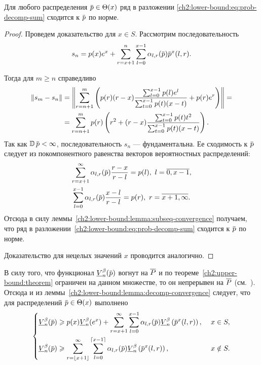 {\begin{lemma}
  \label{ch2:lower-bound:lemma:decomp-convergence}
  Для любого распределения $\pd \in \Theta(x)$ ряд в разложении \eqref{ch2:lower-bound:eq:prob-decomp-sum} сходится к $\pd$ по норме.
\end{lemma}
\begin{proof}
  Проведем доказательство для $x \in S$.
  Рассмотрим последовательность
  \begin{equation*}
    s_n = \pc{x} e^x + \sum_{r=x+1}^n \sum_{l=0}^{x-1} \alpha_{l,r}(\pd) \pd^x(l, r).
  \end{equation*}

  Тогда для $m \geqslant n$ справедливо
  \begin{align*}
    \left\lVert s_m-s_n\right\rVert
    &= \left\lVert
      \sum_{r=n+1}^m \left(
      p(r) (r-x) \frac{\sum_{l=0}^{x-1} p(l) e^l}{\sum_{t=0}^{x-1} p(t) (x-t)} + p(r) e^r
      \right)\right\rVert =\\
    &= \sum_{r=n+1}^m p(r) \left(
      r^2 + (r-x) \frac{\sum_{t=0}^{x-1} p(t) t^2}{\sum_{t=0}^{x-1} p(t) (x-t)}
      \right).
  \end{align*}
  Так как $\D \pd < \infty$, последовательность $s_n$ --- фундаментальна.
  Ее сходимость к $\pd$ следует из покомпонентного равенства векторов вероятностных распределений:
  \begin{gather*}
    \sum_{r=x+1}^\infty \alpha_{l,r}(\pd) \frac{r-x}{r-l} = \pc{l},\ l = \overline{0, x-1}, \\
    \sum_{l=0}^{x-1} \alpha_{l,r}(\pd) \frac{x-l}{r-l} = \pc{r},\ r = \overline{x+1, \infty}.
  \end{gather*}
  Отсюда в силу леммы~\ref{ch2:lower-bound:lemma:subseq-convergence} получаем, что ряд в разложении~\eqref{ch2:lower-bound:eq:prob-decomp-sum} сходится к $\pd$ по норме.

  Доказательство для нецелых значений $x$ проводится аналогично.
\end{proof}

В силу того, что функционал $\LowV{n}(\pd)$ вогнут на $\overline{P}$ и по теореме~\ref{ch2:upper-bound:theorem} ограничен на данном множестве, то он непрерывен на $\overline{P}$ (см.~\cite[Теорема 1.7.1]{polovinkin04}).
Отсюда и из леммы~\ref{ch2:lower-bound:lemma:decomp-convergence} следует, что для распределений $\pd \in \Theta(x)$ выполнено
\begin{equation*}
  \left\{
  \begin{aligned}
    \LowV{n}(\pd) &\geqslant
      \pc{x} \LowV{n}(e^x) + \sum_{r=x+1}^\infty \sum_{l=0}^{x-1} \alpha_{l,r}(\pd) \LowV{n} \left( \pd^x(l, r) \right),&\ x \in S,\\
    \LowV{n}(\pd) &\geqslant 
      \sum_{r=\floor{x+1}}^\infty \sum_{l=0}^{\ceil{x-1}} \alpha_{l,r}(\pd) \LowV{n} \left( \pd^x(l, r) \right),&\ x \notin S.
  \end{aligned}
  \right.
\end{equation*}

}
